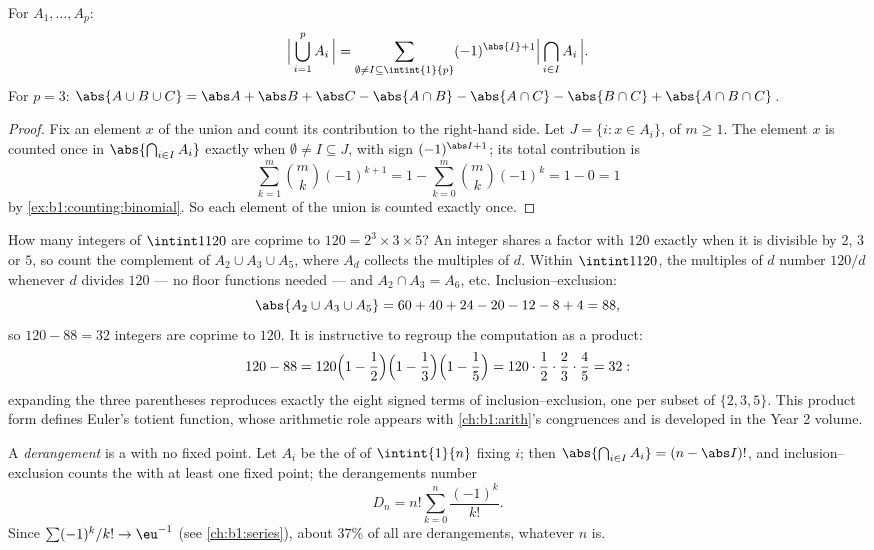 \begin{theorem}\label{thm:b1:counting:inclexcl}
For  $A_1, \dots, A_p$:
\[
\Bigl|\, \bigcup_{i=1}^{p} A_i \,\Bigr|
= \sum_{\emptyset \neq I \subseteq \intint{1}{p}}
(-1)^{\abs{I}+1} \Bigl|\, \bigcap_{i \in I} A_i \,\Bigr| .
\]
For $p = 3$:
$\abs{A \cup B \cup C} = \abs A + \abs B + \abs C - \abs{A \cap B} -
\abs{A \cap C} - \abs{B \cap C} + \abs{A \cap B \cap C}$.
\end{theorem}

\begin{proof}
Fix an element $x$ of the union and count its contribution to the
right-hand side. Let $J = \{i : x \in A_i\}$, of  $m \geq
1$. The element $x$ is counted once in $\abs{\bigcap_{i \in I} A_i}$
exactly when $\emptyset \neq I \subseteq J$, with sign
$(-1)^{\abs I + 1}$; its total contribution is
\[
\sum_{k=1}^{m} \binom{m}{k} (-1)^{k+1}
= 1 - \sum_{k=0}^{m} \binom mk (-1)^k = 1 - 0 = 1
\]
by \cref{ex:b1:counting:binomial}. So each element of the union is
counted exactly once.
\end{proof}

\begin{example}\label{ex:b1:counting:coprime}
How many integers of $\intint1{120}$ are coprime to $120 = 2^3
\times 3 \times 5$? An integer shares a factor with $120$ exactly
when it is divisible by $2$, $3$ or $5$, so count the complement
of $A_2 \cup A_3 \cup A_5$, where $A_d$ collects the multiples of
$d$. Within $\intint1{120}$, the multiples of $d$ number $120/d$
whenever $d$ divides $120$ --- no floor functions needed --- and
$A_2 \cap A_3 = A_6$, etc. Inclusion--exclusion:
\[
\abs{A_2 \cup A_3 \cup A_5}
= 60 + 40 + 24 - 20 - 12 - 8 + 4 = 88 ,
\]
so $120 - 88 = 32$ integers are coprime to $120$. It is
instructive to regroup the computation as a product:
\[
120 - 88 = 120\Bigl(1 - \frac12\Bigr)\Bigl(1 -
\frac13\Bigr)\Bigl(1 - \frac15\Bigr) = 120 \cdot \frac12 \cdot
\frac23 \cdot \frac45 = 32 :
\]
expanding the three parentheses reproduces exactly the eight
signed terms of inclusion--exclusion, one per subset of $\{2, 3,
5\}$. This product form defines Euler's totient function, whose
arithmetic role appears with \cref{ch:b1:arith}'s congruences and
is developed in the Year 2 volume.
\end{example}

\begin{example}[Derangements]\label{ex:b1:counting:derangement}
A \emph{derangement} is a  with no fixed point. Let $A_i$
be the  of  of $\intint{1}{n}$ fixing $i$;
then $\abs{\bigcap_{i \in I} A_i} = (n - \abs I)!$, and
inclusion--exclusion counts the  with at least one fixed
point; the derangements number
\[
D_n = n! \sum_{k=0}^{n} \frac{(-1)^k}{k!} .
\]
Since $\sum (-1)^k / k! \to \eu^{-1}$ (see \cref{ch:b1:series}), about
$37\%$ of all  are derangements, whatever $n$ is.
\end{example}

